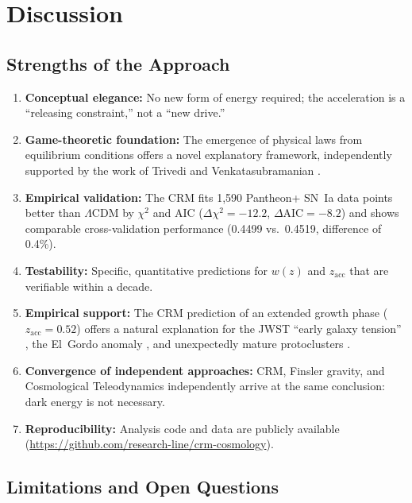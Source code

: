 \documentclass[aps,prd,twocolumn,superscriptaddress,nofootinbib]{revtex4-2}
\begin{document}
\section{Discussion}
\label{sec:discussion}

\subsection{Strengths of the Approach}

\begin{enumerate}
\item \textbf{Conceptual elegance:} No new form of energy required; the acceleration is a ``releasing constraint,'' not a ``new drive.''
\item \textbf{Game-theoretic foundation:} The emergence of physical laws from equilibrium conditions offers a novel explanatory framework, independently supported by the work of Trivedi and Venkatasubramanian \cite{Trivedi2025}.
\item \textbf{Empirical validation:} The CRM fits 1,590 Pantheon+ SN~Ia data points better than $\Lambda$CDM by $\chi^2$ and AIC ($\Delta\chi^2 = -12.2$, $\Delta\mathrm{AIC} = -8.2$) and shows comparable cross-validation performance (0.4499 vs.\ 0.4519, difference of 0.4\%).
\item \textbf{Testability:} Specific, quantitative predictions for $w(z)$ and $z_{\mathrm{acc}}$ that are verifiable within a decade.
\item \textbf{Empirical support:} The CRM prediction of an extended growth phase ($z_{\mathrm{acc}} = 0.52$) offers a natural explanation for the JWST ``early galaxy tension'' \cite{Labbe2023, BoylanKolchin2023}, the El~Gordo anomaly \cite{Asencio2023}, and unexpectedly mature protoclusters \cite{Miller2018}.
\item \textbf{Convergence of independent approaches:} CRM, Finsler gravity, and Cosmological Teleodynamics independently arrive at the same conclusion: dark energy is not necessary.
\item \textbf{Reproducibility:} Analysis code and data are publicly available (\url{https://github.com/research-line/crm-cosmology}).
\end{enumerate}

\subsection{Limitations and Open Questions}
\end{document}

